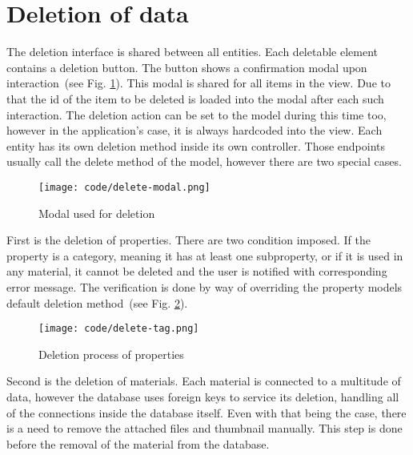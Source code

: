 \documentclass[
  digital,     %
  oneside,     %
  nosansbold,  %
  colorbold, %
  lof,         %
  lot,         %
]{fithesis4}
\newcommand{\imgref}[1]{(see Fig. \ref{fig:#1})}
\begin{document}
\section{Deletion of data}

The deletion interface is shared between all entities. Each deletable element contains a deletion
button. The button shows a confirmation modal upon interaction~\imgref{delete-modal}. This modal
is shared for all items in the view. Due to that the id of the item to be deleted is loaded into the modal
after each such interaction. The deletion action can be set to the model during this time too, however
in the application's case, it is always hardcoded into the view. Each entity has its own deletion method
inside its own controller. Those endpoints usually call the delete method of the model, however there
are two special cases.

\begin{figure}[!htbp]
	\begin{center}
		\begin{minipage}{.6\textwidth}
			\texttt{[image: code/delete-modal.png]}
		\end{minipage}
	\end{center}
	\caption{Modal used for deletion}
	\label{fig:delete-modal}
\end{figure}

First is the deletion of properties. There are two condition imposed. If the property is a category,
meaning it has at least one subproperty, or if it is used in any material, it cannot be deleted and the
user is notified with corresponding error message. The verification is done by way of overriding the
property models default deletion method~\imgref{delete-tag}.

\begin{figure}[!htbp]
	\begin{center}
		\begin{minipage}{.8\textwidth}
			\texttt{[image: code/delete-tag.png]}
		\end{minipage}
	\end{center}
	\caption{Deletion process of properties}
	\label{fig:delete-tag}
\end{figure}

Second is the deletion of materials. Each material is connected to a multitude of data, however the
database uses foreign keys to service its deletion, handling all of the connections inside the database
itself. Even with that being the case, there is a need to remove the attached files and thumbnail
manually. This step is done before the removal of the material from the database.
\end{document}
